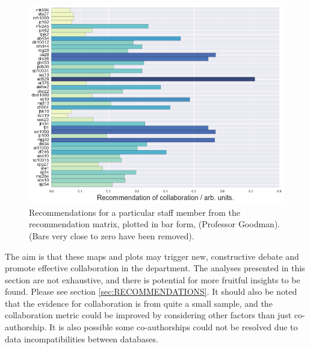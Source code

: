 \begin{center}
\begin{figure}[H]
\label{fig:RECOMM_BAR}
  \centering
    \includegraphics[width=\textwidth]{Analysis/jmg.png}
    \caption{Recommendations for a particular staff member from the recommendation matrix, plotted in bar form, (Professor Goodman). (Bars very close to zero have been removed). }
\end{figure} 
\end{center}
The aim is that these maps and plots may trigger new, constructive debate and promote effective collaboration in the department. The analyses presented in this section are not exhaustive, and there is potential for more fruitful insights to be found. Please see section \ref{sec:RECOMMENDATIONS}. It should also be noted that the evidence for collaboration is from quite a small sample, and the collaboration metric could be improved by considering other factors than just co-authorship. It is also possible some co-authorships could not be resolved due to data incompatibilities between databases.

